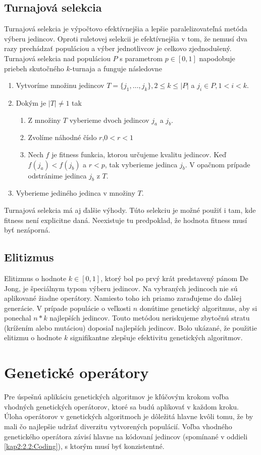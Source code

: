 \subsection{Turnajová selekcia}\label{kap2:2.4:2.4.2:Tournament}
Turnajová selekcia je výpočtovo efektívnejšia a lepšie paralelizovateľná metóda výberu jedincov. Oproti ruletovej selekcii je efektívnejšia v tom, že nemusí dva razy prechádzať populáciou a výber jednotlivcov je celkovo zjednodušený. Turnajová selekcia nad populáciou $P$ s parametrom $p \in [0,1]$ napodobuje priebeh skutočného $k$-turnaja a funguje následovne
\begin{enumerate}
\item Vytvoríme množinu jedincov $T = \{j_1,\ldots,j_k\}, 2 \leq k \leq \lvert P \lvert$ a $j_i \in P, 1 < i < k$.
\item Dokým je $\lvert T \rvert \ne 1$ tak
\begin{enumerate}
\item Z množiny $T$ vyberieme dvoch jedincov $j_a$ a $j_b$. 
\item Zvolíme náhodné číslo $r$,$0 < r < 1$
\item Nech $f$ je fitness funkcia, ktorou určujeme kvalitu jedincov. Keď $f(j_a) < f(j_b)$  a $r < p$, tak vyberieme jedinca $j_b$. V opačnom prípade odstránime jedinca $j_b$ z $T$.
\end{enumerate}
\item Vyberieme jediného jedinca v množiny $T$. 
\end{enumerate} 
Turnajová selekcia má aj ďalšie výhody.
Túto selekciu je možné použiť i tam, kde fitness není explicitne daná. Neexistuje tu predpoklad, že hodnota fitness musí byť nezáporná.

\subsection{Elitizmus}\label{kap2:2.4:2.4.3:Elitism}
Elitizmus o hodnote $k\in[0,1]$, ktorý bol po prvý krát predstavený pánom De Jong, je špeciálnym typom výberu jedincov. Na vybraných jedincoch nie sú aplikované žiadne operátory. Namiesto toho ich priamo zaraďujeme do ďalšej generácie. V prípade populácie o veľkosti $n$ donútime genetický algoritmus, aby si ponechal $n*k$ najlepších jedincov. Touto metódou neriskujeme zbytočnú stratu (krížením alebo mutáciou) doposiaľ najlepších jedincov. Bolo ukázané, že použitie elitizmu o hodnote $k$ signifikantne zlepšuje efektivitu genetických algoritmov.

\section{Genetické operátory}\label{kap2:2.5:Operators}
Pre úspešnú aplikáciu genetických algoritmov je kľúčovým krokom voľba vhodných genetických operátorov, ktoré sa budú aplikovať v každom kroku. Úloha operátorov v genetických algoritmoch je dôležitá hlavne kvôli tomu, že by mali čo najlepšie udržať diverzitu vytvorených populácií. Voľba vhodného genetického operátora závisí hlavne na kódovaní jedincov (spomínané v oddieli \ref{kap2:2.2:Coding}), s ktorým musí byť konzistentné.

